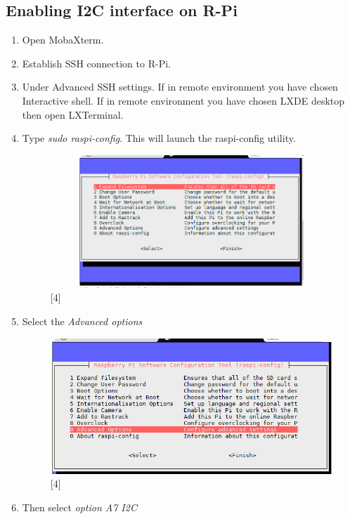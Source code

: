 \documentclass[11pt,a4paper]{article}
\begin{document}
	\subsection{Enabling I2C interface on R-Pi}
	\begin{enumerate}
		\item Open MobaXterm. 
		\item Establish SSH connection to R-Pi.
		\item Under Advanced SSH settings.
		\subitem If in remote environment you have chosen Interactive shell.
		\subitem If in remote environment you have chosen LXDE desktop then open LXTerminal.
		
		\item  Type \textit{sudo raspi-config}. This will launch the raspi-config utility.
		
		\begin{figure}[h!]
			\includegraphics[width=11cm,height=5cm]{i2c_1.png}
			\centering
			\caption{[4]}
			\end{figure}
		\item Select the \textit{Advanced options}
		\begin{figure}[h!]
			\includegraphics[scale=0.6]{i2c_2.png}
			\centering
			\caption{[4]}
		\end{figure} 
		\item Then select \textit{option A7 I2C} 
		\newline

\end{enumerate}
\end{document}
